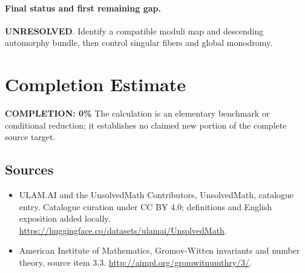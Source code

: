 \documentclass[11pt]{article}
\begin{document}
\paragraph{Final status and first remaining gap.}
\textbf{UNRESOLVED}. Identify a compatible moduli map and descending automorphy bundle, then control singular fibers and global monodromy.

\section{Completion Estimate}
\noindent\textbf{COMPLETION: 0\%}
The calculation is an elementary benchmark or conditional reduction; it establishes no claimed new portion of the complete source target.

\subsection{Sources}
\begin{itemize}
\item[\hypertarget{source:statement:1}{S1}] ULAM.AI and the UnsolvedMath Contributors, UnsolvedMath, catalogue entry. Catalogue curation under CC BY 4.0; definitions and English exposition added locally.
\url{https://huggingface.co/datasets/ulamai/UnsolvedMath}.
\item[\hypertarget{source:statement:2}{S2}] American Institute of Mathematics, Gromov-Witten invariants and number theory, source item 3.3.
\url{http://aimpl.org/gromwitnumthry/3/}.
\end{itemize}
\label{end:statement}
\end{document}
